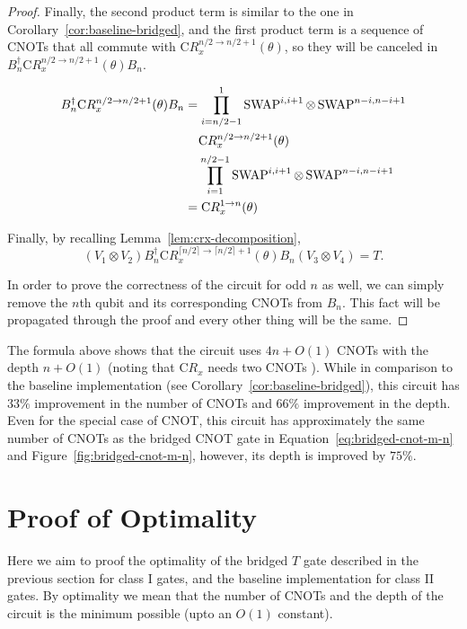 \begin{proof}
  Finally, the second product term is similar to the one in Corollary~\ref{cor:baseline-bridged}, and the first product term is a sequence of CNOTs that all commute with $\mathrm{C}R_x^{n/2 \to n/2 + 1}(\theta)$, so they will be canceled in $B_n^\dagger \mathrm{C}R_x^{n/2 \to n/2 + 1}(\theta) B_n$.

  \begin{equation}
    \begin{aligned}
    B^\dagger_n \mathrm{C}R_x^{n/2 \to n/2 + 1}(\theta) B_n &= \prod_{i=n/2 - 1}^{1} \operatorname{SWAP}^{i, i+1} \otimes \operatorname{SWAP}^{n-i, n-i+1} \\
    & \phantom{=}~\mathrm{C}R_x^{n/2 \to n/2 + 1}(\theta) \\
    & \phantom{=}~\prod_{i=1}^{n/2 - 1} \operatorname{SWAP}^{i, i+1} \otimes \operatorname{SWAP}^{n-i, n-i+1} \\
    &= \mathrm{C}R_x^{1 \to n}(\theta)
    \end{aligned}
  \end{equation}

  Finally, by recalling Lemma~\ref{lem:crx-decomposition},
  \begin{equation}
    (V_1 \otimes V_2) B^\dagger_n \mathrm{C}R_x^{\lceil n/2 \rceil \to \lceil n/2\rceil+1}(\theta) B_n (V_3 \otimes V_4) = T.
  \end{equation}
  
  In order to prove the correctness of the circuit for odd $n$ as well, we can simply remove the $n$th qubit and its corresponding CNOTs from $B_n$. This fact will be propagated through the proof and every other thing will be the same.
\end{proof}

The formula above shows that the circuit uses $4n + O(1)$ CNOTs with the depth $n + O(1)$ (noting that $\mathrm{C}R_x$ needs two CNOTs \cite[chapter 4]{nielsen2010}). 
While in comparison to the baseline implementation (see Corollary~\ref{cor:baseline-bridged}), this circuit has $33\%$ improvement in the number of CNOTs and $66\%$ improvement in the depth. Even for the special case of CNOT, this circuit has approximately the same number of CNOTs as the bridged CNOT gate in Equation~\ref{eq:bridged-cnot-m-n} and Figure~\ref{fig:bridged-cnot-m-n}, however, its depth is improved by $75\%$.

\section{Proof of Optimality}

Here we aim to proof the optimality of the bridged $T$ gate described in the previous section for class I gates, and the baseline implementation for class II gates. By optimality we mean that the number of CNOTs and the depth of the circuit is the minimum possible (upto an $O(1)$ constant).

